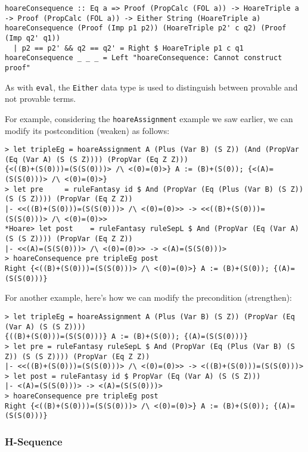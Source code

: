 \documentclass{article}
\begin{document}
\begin{lstlisting}
hoareConsequence :: Eq a => Proof (PropCalc (FOL a)) -> HoareTriple a -> Proof (PropCalc (FOL a)) -> Either String (HoareTriple a)
hoareConsequence (Proof (Imp p1 p2)) (HoareTriple p2' c q2) (Proof (Imp q2' q1))
  | p2 == p2' && q2 == q2' = Right $ HoareTriple p1 c q1
hoareConsequence _ _ _ = Left "hoareConsequence: Cannot construct proof"
\end{lstlisting}

As with \texttt{eval}, the \texttt{Either} data type is used to distinguish between provable and not provable terms.

For example, considering the \texttt{hoareAssignment} example we saw earlier, we can modify its postcondition (weaken) as follows:

\begin{lstlisting}
> let tripleEg = hoareAssignment A (Plus (Var B) (S Z)) (And (PropVar (Eq (Var A) (S (S Z)))) (PropVar (Eq Z Z)))
{<((B)+(S(0)))=(S(S(0)))> /\ <(0)=(0)>} A := (B)+(S(0)); {<(A)=(S(S(0)))> /\ <(0)=(0)>}
> let pre     = ruleFantasy id $ And (PropVar (Eq (Plus (Var B) (S Z)) (S (S Z)))) (PropVar (Eq Z Z))
|- <<((B)+(S(0)))=(S(S(0)))> /\ <(0)=(0)>> -> <<((B)+(S(0)))=(S(S(0)))> /\ <(0)=(0)>>
*Hoare> let post    = ruleFantasy ruleSepL $ And (PropVar (Eq (Var A) (S (S Z)))) (PropVar (Eq Z Z))
|- <<(A)=(S(S(0)))> /\ <(0)=(0)>> -> <(A)=(S(S(0)))>
> hoareConsequence pre tripleEg post
Right {<((B)+(S(0)))=(S(S(0)))> /\ <(0)=(0)>} A := (B)+(S(0)); {(A)=(S(S(0)))}
\end{lstlisting}

For another example, here's how we can modify the precondition (strengthen):

\begin{lstlisting}
> let tripleEg = hoareAssignment A (Plus (Var B) (S Z)) (PropVar (Eq (Var A) (S (S Z))))
{((B)+(S(0)))=(S(S(0)))} A := (B)+(S(0)); {(A)=(S(S(0)))}
> let pre = ruleFantasy ruleSepL $ And (PropVar (Eq (Plus (Var B) (S Z)) (S (S Z)))) (PropVar (Eq Z Z))
|- <<((B)+(S(0)))=(S(S(0)))> /\ <(0)=(0)>> -> <((B)+(S(0)))=(S(S(0)))>
> let post = ruleFantasy id $ PropVar (Eq (Var A) (S (S Z)))
|- <(A)=(S(S(0)))> -> <(A)=(S(S(0)))>
> hoareConsequence pre tripleEg post
Right {<((B)+(S(0)))=(S(S(0)))> /\ <(0)=(0)>} A := (B)+(S(0)); {(A)=(S(S(0)))}
\end{lstlisting}

\subsubsection{H-Sequence}
\end{document}
